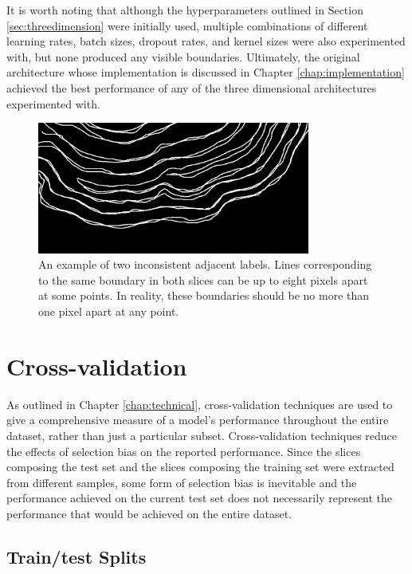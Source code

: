 It is worth noting that although the hyperparameters outlined in Section \ref{sec:threedimension} were initially used, multiple combinations of different learning rates, batch sizes, dropout rates, and kernel sizes were also experimented with, but none produced any visible boundaries. Ultimately, the original architecture whose implementation is discussed in Chapter \ref{chap:implementation} achieved the best performance of any of the three dimensional architectures experimented with.

\begin{figure}[t]
    \centering
    \includegraphics[width=0.8\textwidth]{images/3D-label-example.png}
    \caption{An example of two inconsistent adjacent labels. Lines corresponding to the same boundary in both slices can be up to eight pixels apart at some points. In reality, these boundaries should be no more than one pixel apart at any point.}
    \label{fig:3dlabel}
\end{figure}

\section{Cross-validation}
\label{sec:evalcrossval}

As outlined in Chapter \ref{chap:technical}, cross-validation techniques are used to give a comprehensive measure of a model's performance throughout the entire dataset, rather than just a particular subset. Cross-validation techniques reduce the effects of selection bias on the reported performance. Since the slices composing the test set and the slices composing the training set were extracted from different samples, some form of selection bias is inevitable and the performance achieved on the current test set does not necessarily represent the performance that would be achieved on the entire dataset.

\subsection{Train/test Splits}

